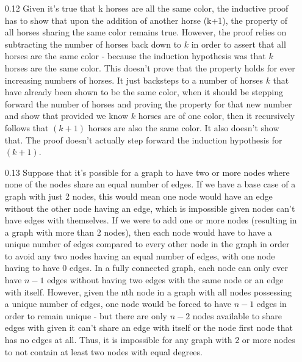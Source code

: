 \documentclass{article}
\begin{document}
\begin{itemize}
  \item[0.12] Given it's true that k horses are all the same color, the inductive proof has to show that upon the addition of another horse (k+1), the property of all horses sharing the same color remains true. However, the proof relies on subtracting the number of horses back down to $k$ in order to assert that all horses are the same color - because the induction hypothesis was that $k$ horses are the same color. This doesn't prove that the property holds for ever increasing numbers of horses. It
    just backsteps to a number of horses $k$ that have already been shown to be the same color, when it should be stepping forward the number of horses and proving the property for that new number and show that provided we know $k$ horses are of one color, then it recursively follows that $(k+1)$ horses are also the same color. It also doesn't show that. The proof doesn't actually step forward the induction hypothesis for $(k+1)$.
  \item[0.13] Suppose that it's possible for a graph to have two or more nodes where none of the nodes share an equal number of edges. If we have a base case of a graph with just 2 nodes, this would mean one node would have an edge without the other node having an edge, which is impossible given nodes can't have edges with themselves. If we were to add one or more nodes (resulting in a graph with more than 2 nodes), then each node would have to have a unique number of edges compared to every
    other node in the graph in order to avoid any two nodes having an equal number of edges, with one node having to have 0 edges. In a fully connected graph, each node can only ever have $n-1$ edges without having two edges with the same node or an edge with itself. However, given the nth node in a graph with all nodes possessing a unique number of edges, one node would be forced to have $n-1$ edges in order to remain unique - but there are only $n-2$ nodes available to share edges with given
    it can't share an edge with itself or the node first node that has no edges at all. Thus, it is impossible for any graph with 2 or more nodes to not contain at least two nodes with equal degrees.
\end{itemize}
\end{document}
